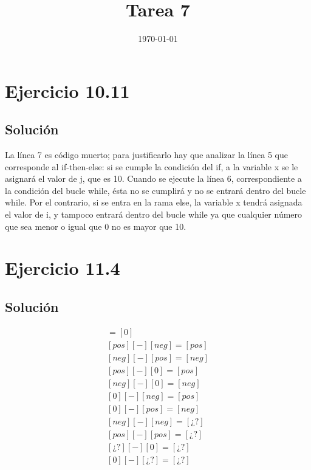 \documentclass[11pt, a4paper, titlepage]{article}
\begin{document}
\title{Tarea 7}
\date{\today}
\maketitle
\newpage

\section*{Ejercicio 10.11}
\subsection*{Solución}

La línea 7 es código muerto; para justificarlo hay que analizar la línea 5 que
corresponde al if-then-else: si se cumple la condición del if, a la variable x
se le asignará el valor de j, que es 10. Cuando se ejecute la línea 6, correspondiente
a la condición del bucle while, ésta no se cumplirá y no se entrará dentro del bucle
while. Por el contrario, si se entra en la rama else, la variable x tendrá asignada
el valor de i, y tampoco entrará dentro del bucle while ya que cualquier número
que sea menor o igual que 0 no es mayor que 10.

\section*{Ejercicio 11.4}
\subsection*{Solución}
\begin{align*}
  [0] [-] [0] = [0]\\
  [pos] [-] [neg] = [pos]\\
  [neg] [-] [pos] = [neg]\\
  [pos] [-] [0] = [pos]\\
  [neg] [-] [0] = [neg]\\
  [0] [-] [neg] = [pos]\\
  [0] [-] [pos] = [neg]\\
  [neg] [-] [neg] = [¿?]\\
  [pos] [-] [pos] = [¿?]\\
  [¿?] [-] [0] = [¿?]\\
  [0] [-] [¿?] = [¿?]
\end{align*}
\newline
\end{document}
